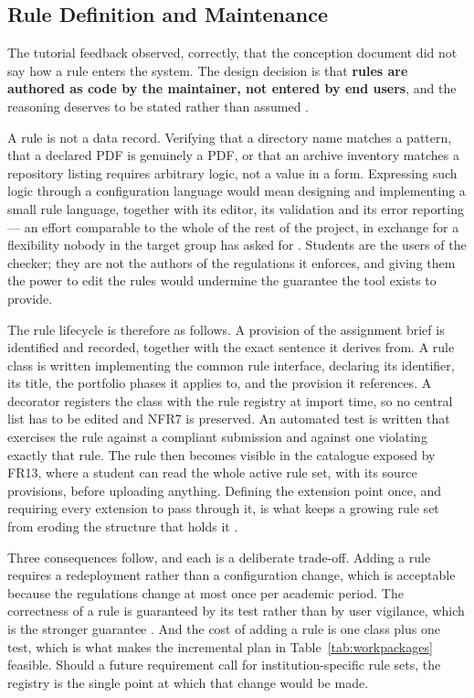 \documentclass[a4paper,11pt]{article}
\begin{document}
\subsection{Rule Definition and Maintenance}\label{subsec:ruleauthoring}

The tutorial feedback observed, correctly, that the conception document did not
say how a rule enters the system. The design decision is that
\textbf{rules are authored as code by the maintainer, not entered by end users},
and the reasoning deserves to be stated rather than assumed
\citep{Richards2020}.

A rule is not a data record. Verifying that a directory name matches a pattern,
that a declared PDF is genuinely a PDF, or that an archive inventory matches a
repository listing requires arbitrary logic, not a value in a form. Expressing
such logic through a configuration language would mean designing and
implementing a small rule language, together with its editor, its validation and
its error reporting --- an effort comparable to the whole of the rest of the
project, in exchange for a flexibility nobody in the target group has asked for
\citep{Sommerville2020}. Students are the users of the checker; they are not the
authors of the regulations it enforces, and giving them the power to edit the
rules would undermine the guarantee the tool exists to provide.

The rule lifecycle is therefore as follows. A provision of the assignment brief
is identified and recorded, together with the exact sentence it derives from. A
rule class is written implementing the common rule interface, declaring its
identifier, its title, the portfolio phases it applies to, and the provision it
references. A decorator registers the class with the rule registry at import
time, so no central list has to be edited and NFR7 is preserved. An automated
test is written that exercises the rule against a compliant submission and
against one violating exactly that rule. The rule then becomes visible in the
catalogue exposed by FR13, where a student can read the whole active rule set,
with its source provisions, before uploading anything. Defining the extension
point once, and requiring every extension to pass through it, is what keeps a
growing rule set from eroding the structure that holds it \citep{Percival2020}.

Three consequences follow, and each is a deliberate trade-off. Adding a rule
requires a redeployment rather than a configuration change, which is acceptable
because the regulations change at most once per academic period. The correctness
of a rule is guaranteed by its test rather than by user vigilance, which is the
stronger guarantee \citep{Khorikov2020}. And the cost of adding a rule is one
class plus one test, which is what makes the incremental plan in
Table~\ref{tab:workpackages} feasible. Should a future requirement call for
institution-specific rule sets, the registry is the single point at which that
change would be made.
\end{document}
